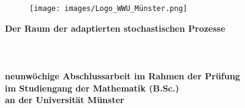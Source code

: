 \documentclass[12pt]{article}
\theoremstyle{definition}
\begin{document}




\begin{titlepage}
    \begin{figure}[t]
        \texttt{[image: images/Logo\_WWU\_Münster.png]}
    \end{figure}
   \begin{center}
        \vspace*{1cm}
       \textbf{\huge Der Raum der adaptierten stochastischen Prozesse}
       \paragraph{}$~~$\\
       \paragraph{}$~~$\\
       \paragraph{}$~~$\\
       \textbf{neunwöchige Abschlussarbeit im Rahmen der Prüfung} \\ \textbf{im Studiengang der Mathematik (B.Sc.)} \\ \textbf{an der Universität Münster}
       \paragraph{}$~~$\\
       \paragraph{}$~~$\\
       \paragraph{}$~~$\\
        \\
        \\
        \\
       \paragraph{}$~~$\\
            
   \end{center}
\end{titlepage}
\end{document}
